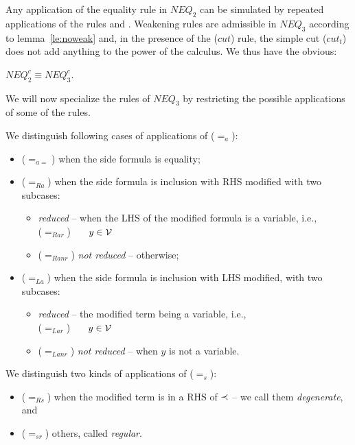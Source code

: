 \noindent
Any application of the equality rule  in $NEQ_2$ can be simulated
by repeated applications of the rules  and . 
Weakening rules are admissible in $NEQ_3$ according to lemma~\ref{le:noweak} and, in
the presence of the ($cut$) rule, the simple cut ($cut_t$) does not add anything to the
power of the calculus.
We thus have the obvious:
\begin{LEMMA}\label{le:neq2isneq3}
 $NEQ_2^c \equiv NEQ_3^c$.
\end{LEMMA}
%
\noindent
We will now specialize the rules of $NEQ_3$ by restricting the possible
applications of some of the rules.
%
\begin{DEFINITION}\label{de:eqALR}\label{de:eqSD}\label{de:inclad}\label{de:anr}
We distinguish following cases of applications of ($=_a$):
\begin{itemize}\MyLPar
\item ($=_{a=}$) when the side formula is equality;
\item ($=_{Ra}$) when the side formula is inclusion with RHS modified with
two subcases:
\begin{itemize}\MyLPar
\item {\em reduced} -- when the LHS of the modified formula is a
variable, i.e., \\
 ($=_{Rar}$)\ \  \ $y\in{\cal V}$
\item ($=_{Ranr}$) {\em not reduced} -- otherwise;
\end{itemize}
\item ($=_{La}$) when the side formula is inclusion with LHS modified, with
two subcases:
\begin{itemize}\MyLPar
\item {\em reduced} -- the modified term being a variable, i.e., \\
  ($=_{Lar}$) \ \ \ $y\in{\cal V}$
\item ($=_{Lanr}$) {\em not reduced} -- when $y$ is not a variable.
\end{itemize}
\end{itemize}
We distinguish two kinds of applications of ($=_s$):
\begin{itemize}\MyLPar
\item ($=_{Rs}$)  when the modified term is in a RHS of $\mathbin{\prec}$ -- we call
them {\em degenerate}, and
\item ($=_{sr}$) others, called {\em regular}.

\end{itemize}
\end{DEFINITION}
